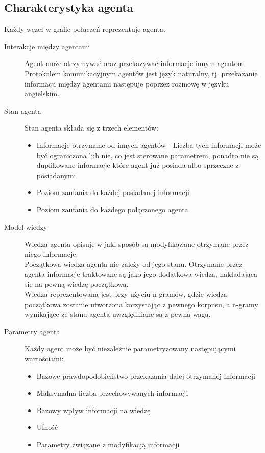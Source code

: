 \documentclass{article}
\begin{document}
	\subsection{Charakterystyka agenta}
	Każdy węzeł w grafie połączeń reprezentuje agenta.
	\begin{description}
		\item[Interakcje między agentami]
		Agent może otrzymywać oraz przekazywać informacje innym agentom.
		Protokołem komunikacyjnym agentów jest język naturalny, tj.
		przekazanie informacji między agentami następuje poprzez rozmowę
w języku angielskim.
		\item[Stan agenta]
		Stan agenta składa się z trzech elementów:
		\begin{itemize}
			\item {Informacje otrzymane od innych agentów - 
			Liczba tych informacji może być ograniczona lub nie, co jest sterowane parametrem,
			ponadto nie są duplikowane informacje które agent już posiada albo sprzeczne z posiadanymi.}
			\item {Poziom zaufania do każdej posiadanej informacji}
			\item {Poziom zaufania do każdego połączonego agenta}
		\end{itemize}	
		\item[Model wiedzy]
		Wiedza agenta opisuje w jaki sposób są modyfikowane otrzymane przez niego informacje.\\
		Początkowa wiedza agenta nie zależy od jego stanu.
		Otrzymane przez agenta informacje traktowane są jako jego dodatkowa wiedza,
		nakładająca się na pewną wiedzę początkową.\\
		Wiedza reprezentowana jest przy użyciu n-gramów,
		gdzie wiedza początkowa zostanie utworzona korzystając z pewnego korpusu,
		a n-gramy wynikające ze stanu agenta uwzględniane są z pewną wagą.
		\item[Parametry agenta] Każdy agent może być niezależnie parametryzowany następującymi wartościami:
		\begin{itemize}
			\item{Bazowe prawdopodobieństwo przekazania dalej otrzymanej informacji}
			\item{Maksymalna liczba przechowywanych informacji}
			\item{Bazowy wpływ informacji na wiedzę}
			\item{Ufność}
			\item{Parametry związane z modyfikacją informacji}
		\end{itemize}
	\end{description}
\end{document}
